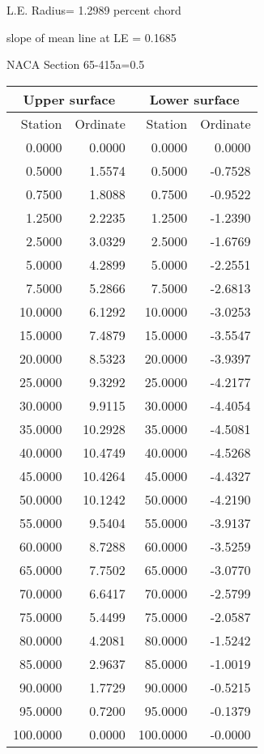 \documentclass[11pt]{book}
\begin{document}
L.E. Radius=  1.2989 percent chord


 slope of mean line at LE =  0.1685
 \newpage
  \label{s65-415a=0.5}
 \begin{Large}
 NACA Section 65-415a=0.5
 \end{Large}
  
 \vspace{8mm}
 \begin{tabular}{|r|r|r|r|} \hline 
 \multicolumn{2}{|c|}{Upper surface} & \multicolumn{2}{|c|}{Lower surface} \\
 \hline
 Station & Ordinate & Station & Ordinate \\
 \hline
0.0000 & 0.0000 & 0.0000 & 0.0000 \\
0.5000 & 1.5574 & 0.5000 & -0.7528 \\
0.7500 & 1.8088 & 0.7500 & -0.9522 \\
1.2500 & 2.2235 & 1.2500 & -1.2390 \\
2.5000 & 3.0329 & 2.5000 & -1.6769 \\
5.0000 & 4.2899 & 5.0000 & -2.2551 \\
7.5000 & 5.2866 & 7.5000 & -2.6813 \\
10.0000 & 6.1292 & 10.0000 & -3.0253 \\
15.0000 & 7.4879 & 15.0000 & -3.5547 \\
20.0000 & 8.5323 & 20.0000 & -3.9397 \\
25.0000 & 9.3292 & 25.0000 & -4.2177 \\
30.0000 & 9.9115 & 30.0000 & -4.4054 \\
35.0000 & 10.2928 & 35.0000 & -4.5081 \\
40.0000 & 10.4749 & 40.0000 & -4.5268 \\
45.0000 & 10.4264 & 45.0000 & -4.4327 \\
50.0000 & 10.1242 & 50.0000 & -4.2190 \\
55.0000 & 9.5404 & 55.0000 & -3.9137 \\
60.0000 & 8.7288 & 60.0000 & -3.5259 \\
65.0000 & 7.7502 & 65.0000 & -3.0770 \\
70.0000 & 6.6417 & 70.0000 & -2.5799 \\
75.0000 & 5.4499 & 75.0000 & -2.0587 \\
80.0000 & 4.2081 & 80.0000 & -1.5242 \\
85.0000 & 2.9637 & 85.0000 & -1.0019 \\
90.0000 & 1.7729 & 90.0000 & -0.5215 \\
95.0000 & 0.7200 & 95.0000 & -0.1379 \\
100.0000 & 0.0000 & 100.0000 & -0.0000 \\
 \hline 
 \end{tabular}
\end{document}
